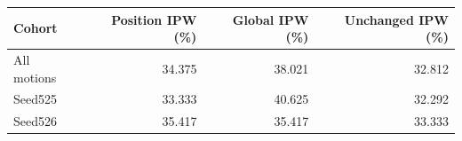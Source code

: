 \begin{tabular}{lrrr}
\toprule
Cohort & Position IPW (\%) & Global IPW (\%) & Unchanged IPW (\%)\\
\midrule
All motions & 34.375 & 38.021 & 32.812\\
Seed525 & 33.333 & 40.625 & 32.292\\
Seed526 & 35.417 & 35.417 & 33.333\\
\bottomrule
\end{tabular}
